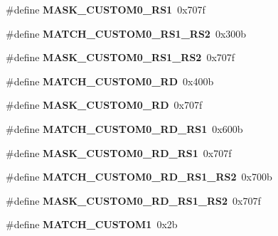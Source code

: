 \begin{DoxyCompactItemize}
\#define {\bfseries M\+A\+S\+K\+\_\+\+C\+U\+S\+T\+O\+M0\+\_\+\+R\+S1}~0x707f
\item 
\mbox{\label{riscv-utility_8h_a07bf92f50e67aa88c7ceddb669e5bb3a}} 
\#define {\bfseries M\+A\+T\+C\+H\+\_\+\+C\+U\+S\+T\+O\+M0\+\_\+\+R\+S1\+\_\+\+R\+S2}~0x300b
\item 
\mbox{\label{riscv-utility_8h_ae43fb106ff83ea824795e0327bb0f462}} 
\#define {\bfseries M\+A\+S\+K\+\_\+\+C\+U\+S\+T\+O\+M0\+\_\+\+R\+S1\+\_\+\+R\+S2}~0x707f
\item 
\mbox{\label{riscv-utility_8h_aa1dd6b1951557f90f31a9d8f8fab40e4}} 
\#define {\bfseries M\+A\+T\+C\+H\+\_\+\+C\+U\+S\+T\+O\+M0\+\_\+\+RD}~0x400b
\item 
\mbox{\label{riscv-utility_8h_aaa52f3cdbb5adc7ee9250ee81ec46000}} 
\#define {\bfseries M\+A\+S\+K\+\_\+\+C\+U\+S\+T\+O\+M0\+\_\+\+RD}~0x707f
\item 
\mbox{\label{riscv-utility_8h_a8d5f0ab2a7994662621ed61248781143}} 
\#define {\bfseries M\+A\+T\+C\+H\+\_\+\+C\+U\+S\+T\+O\+M0\+\_\+\+R\+D\+\_\+\+R\+S1}~0x600b
\item 
\mbox{\label{riscv-utility_8h_ab007dfd4ae110b511278c53291670e59}} 
\#define {\bfseries M\+A\+S\+K\+\_\+\+C\+U\+S\+T\+O\+M0\+\_\+\+R\+D\+\_\+\+R\+S1}~0x707f
\item 
\mbox{\label{riscv-utility_8h_a56326d8d642670d84b3de7ff3195da92}} 
\#define {\bfseries M\+A\+T\+C\+H\+\_\+\+C\+U\+S\+T\+O\+M0\+\_\+\+R\+D\+\_\+\+R\+S1\+\_\+\+R\+S2}~0x700b
\item 
\mbox{\label{riscv-utility_8h_a77c548c7a473089e25a3333eca835399}} 
\#define {\bfseries M\+A\+S\+K\+\_\+\+C\+U\+S\+T\+O\+M0\+\_\+\+R\+D\+\_\+\+R\+S1\+\_\+\+R\+S2}~0x707f
\item 
\mbox{\label{riscv-utility_8h_ab9121062615e8d9db5ef015709d46909}} 
\#define {\bfseries M\+A\+T\+C\+H\+\_\+\+C\+U\+S\+T\+O\+M1}~0x2b
\item 
\mbox{\label{riscv-utility_8h_af8d8b5bf136598e9f72f36ec4c3e51f8}} 

\end{DoxyCompactItemize}
